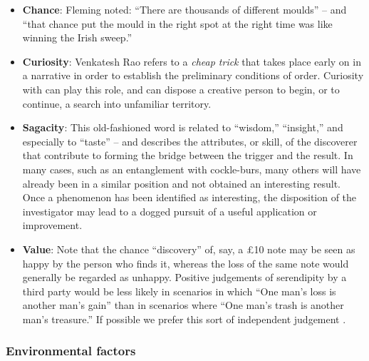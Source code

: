 \begin{itemize}
\item \textbf{Chance}: Fleming \citeyear{fleming} noted: ``There are
  thousands of different moulds'' -- and ``that chance put the mould
  in the right spot at the right time was like winning the Irish
  sweep.''
\end{itemize}

\begin{itemize}
\item \textbf{Curiosity}: Venkatesh Rao \citeyear{rao2011tempo} refers
  to a \emph{cheap trick} that takes place early on in a narrative in
  order to establish the preliminary conditions of order.  Curiosity
  with can play this role, and can dispose a creative person to begin,
  or to continue, a search into unfamiliar territory.
\end{itemize}

\begin{itemize}
\item \textbf{Sagacity}: This old-fashioned word is related to
  ``wisdom,'' ``insight,'' and especially to ``taste'' -- and
  describes the attributes, or skill, of the discoverer that
  contribute to forming the bridge between the trigger and the result.
  In many cases, such as an entanglement with cockle-burs, many others
  will have already been in a similar position and not obtained an
  interesting result.  Once a phenomenon has been identified as
  interesting, the disposition of the investigator may lead to a
  dogged pursuit of a useful application or improvement.
\end{itemize}

\begin{itemize}
\item \textbf{Value}: Note that the chance ``discovery'' of, say, a
  \pounds 10 note may be seen as happy by the person who finds it,
  whereas the loss of the same note would generally be regarded as
  unhappy.  Positive judgements of serendipity by a third party would
  be less likely in scenarios in which ``One man's loss is another
  man's gain'' than in scenarios where ``One man's trash is another
  man's treasure.''  If possible we prefer this sort of independent
  judgement \cite{jordanous:12}.
\end{itemize}

\subsubsection*{Environmental factors}

